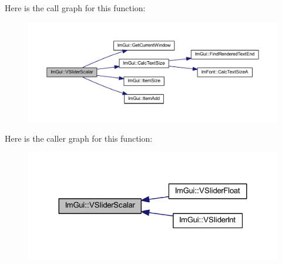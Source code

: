 Here is the call graph for this function\+:
\nopagebreak
\begin{figure}[H]
\begin{center}
\leavevmode
\includegraphics[width=350pt]{namespace_im_gui_a8cf70d5b37efd3571df69472bc9c92bb_cgraph}
\end{center}
\end{figure}
Here is the caller graph for this function\+:
\nopagebreak
\begin{figure}[H]
\begin{center}
\leavevmode
\includegraphics[width=324pt]{namespace_im_gui_a8cf70d5b37efd3571df69472bc9c92bb_icgraph}
\end{center}
\end{figure}
